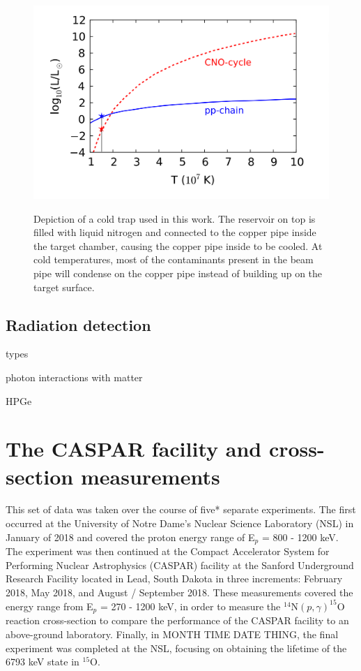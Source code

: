 \begin{figure}
\includegraphics[width=\linewidth]{figures/energyProduction.png}
\label{fig: coldtrap}
\caption{Depiction of a cold trap used in this work. The reservoir on top is filled with liquid nitrogen and connected to the copper pipe inside the target chamber, causing the copper pipe inside to be cooled. At cold temperatures, most of the contaminants present in the beam pipe will condense on the copper pipe instead of building up on the target surface.}
\end{figure}



\subsection{Radiation detection}
\label{sec: detectors}



types

photon interactions with matter

HPGe


\section{The CASPAR facility and cross-section measurements}
\label{sec: cs experiment}



This set of data was taken over the course of five* separate experiments. The first occurred at the University of Notre Dame's Nuclear Science Laboratory (NSL) in January of 2018 and covered the proton energy range of E$_{p}$ = 800 - 1200 keV. The experiment was then continued at the Compact Accelerator System for Performing Nuclear Astrophysics (CASPAR) facility at the Sanford Underground Research Facility located in Lead, South Dakota in three increments: February 2018, May 2018, and August / September 2018. These measurements covered the energy range from E$_{p}$ = 270 - 1200 keV, in order to measure the $^{14}$N$\left( p,\gamma \right) ^{15}$O reaction cross-section to compare the performance of the CASPAR facility to an above-ground laboratory. Finally, in MONTH TIME DATE THING, the final experiment was completed at the NSL, focusing on obtaining the lifetime of the 6793 keV state in $^{15}$O.


